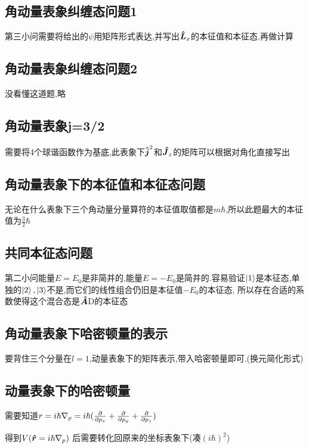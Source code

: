 \documentclass{article}
\begin{document}
        \subsection{角动量表象纠缠态问题1}
            第三小问需要将给出的$\psi$用矩阵形式表达,并写出$\vu*{L}_{x}$的本征值和本征态,再做计算


        \subsection{角动量表象纠缠态问题2}
            没看懂这道题,略

        \subsection{角动量表象j=3/2}
            需要将4个球谐函数作为基底,此表象下$\vu*{j}^{2}$和$\vu*{J}_{z}$的矩阵可以根据对角化直接写出

        \subsection{角动量表象下的本征值和本征态问题}
            无论在什么表象下三个角动量分量算符的本征值取值都是$m\hbar$,所以此题最大的本征值为$\frac{3}{2}\hbar$
        
        \subsection{共同本征态问题}
            第二小问能量$E=E_{0}$是非简并的,能量$E=-E_{0}$是简并的.容易验证$\ket{1}$是本征态,单独的$\ket{2},\ket{3}$不是,而它们的线性组合仍旧是本征值$-E_{0}$的本征态,
            所以存在合适的系数使得这个混合态是$\vu*{A}$D的本征态
        
        \subsection{角动量表象下哈密顿量的表示}
            要背住三个分量在$l=1$,动量表象下的矩阵表示,带入哈密顿量即可.(换元简化形式)

        \subsection{动量表象下的哈密顿量}
            需要知道$r = i\hbar \nabla_{p} = i\hbar (\pdv{p_{x}} + \pdv{p_{y}} + \pdv{p_{z}} )$
            
            得到$ V(\vu*{r} = i\hbar \nabla_{p})$ 后需要转化回原来的坐标表象下(凑$(i\hbar)^{2}$)
\end{document}
